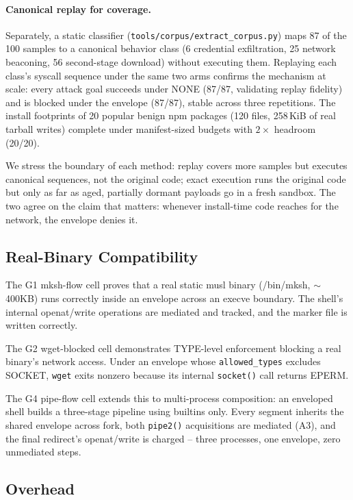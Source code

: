 \documentclass[letterpaper,twocolumn,10pt]{article}
\begin{document}
\paragraph{Canonical replay for coverage.}
Separately, a static classifier
(\texttt{tools/corpus/extract\_corpus.py}) maps 87 of the 100 samples to
a canonical behavior class (6 credential exfiltration, 25 network
beaconing, 56 second-stage download) without executing them.  Replaying
each class's syscall sequence under the same two arms confirms the
mechanism at scale: every attack goal succeeds under NONE (87/87,
validating replay fidelity) and is blocked under the envelope (87/87),
stable across three repetitions.  The install footprints of 20 popular
benign npm packages (120 files, 258\,KiB of real tarball writes)
complete under manifest-sized budgets with $2\times$ headroom (20/20).

We stress the boundary of each method: replay covers more samples but
executes canonical sequences, not the original code; exact execution
runs the original code but only as far as aged, partially dormant
payloads go in a fresh sandbox.  The two agree on the claim that
matters: whenever install-time code reaches for the network, the
envelope denies it.

\subsection{Real-Binary Compatibility}

The G1 mksh-flow cell proves that a real static musl binary
(/bin/mksh, ${\sim}$400KB) runs correctly inside an envelope across
an execve boundary.  The shell's internal openat/write operations are
mediated and tracked, and the marker file is written correctly.

The G2 wget-blocked cell demonstrates TYPE-level enforcement blocking
a real binary's network access.  Under an envelope whose
\texttt{allowed\_types} excludes SOCKET, \texttt{wget} exits nonzero
because its internal \texttt{socket()} call returns EPERM.

The G4 pipe-flow cell extends this to multi-process composition: an
enveloped shell builds a three-stage pipeline using builtins only.
Every segment inherits the shared envelope across fork, both
\texttt{pipe2()} acquisitions are mediated (A3), and the final
redirect's openat/write is charged -- three processes, one envelope,
zero unmediated steps.

\subsection{Overhead}
\end{document}
